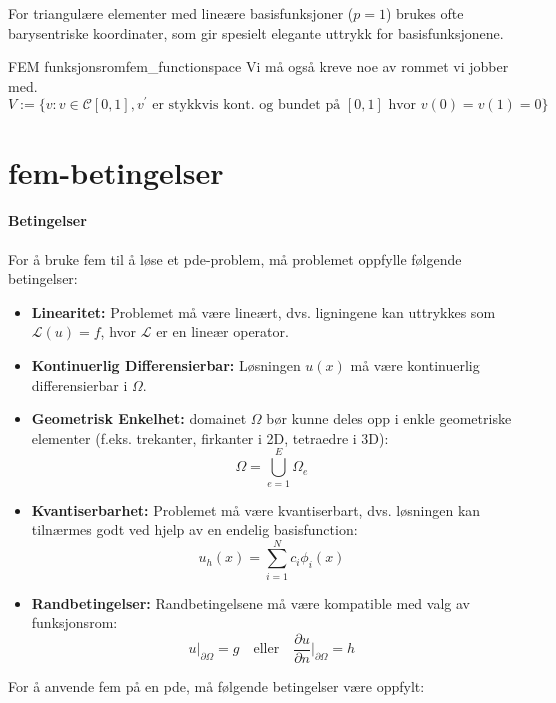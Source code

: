 For triangulære elementer med lineære basisfunksjoner ($p=1$) brukes ofte barysentriske koordinater, som gir spesielt elegante uttrykk for basisfunksjonene.

\begin{remark}{FEM funksjonsrom}{fem_functionspace}
    Vi må også kreve noe av rommet vi jobber med.
    \[
        V := \{v : v \in \mathcal{C}[0, 1], v^\prime \text{ er stykkvis kont. og bundet på } [0, 1] \text{ hvor } v(0)=v(1)= 0\}
    \]
\end{remark}

\section{fem-betingelser}

\paragraph{Betingelser}

For å bruke fem til å løse et pde-problem, må problemet oppfylle følgende betingelser:

\begin{itemize}
    \item \textbf{Linearitet:} Problemet må være lineært, dvs. ligningene kan uttrykkes som \(\mathcal{L}(u) = f\), hvor \(\mathcal{L}\) er en lineær operator.
    \item \textbf{Kontinuerlig Differensierbar:} Løsningen \( u(x) \) må være kontinuerlig differensierbar i \( \Omega \).
    \item \textbf{Geometrisk Enkelhet:} domainet \( \Omega \) bør kunne deles opp i enkle geometriske elementer (f.eks. trekanter, firkanter i 2D, tetraedre i 3D):
          \[
              \Omega = \bigcup_{e=1}^{E} \Omega_e
          \]
    \item \textbf{Kvantiserbarhet:} Problemet må være kvantiserbart, dvs. løsningen kan tilnærmes godt ved hjelp av en endelig basisfunction:
          \[
              u_h(x) = \sum_{i=1}^{N} c_i \phi_i(x)
          \]
    \item \textbf{Randbetingelser:} Randbetingelsene må være kompatible med valg av funksjonsrom:
          \[
              u|_{\partial \Omega} = g \quad \text{eller} \quad \frac{\partial u}{\partial n}\bigg|_{\partial \Omega} = h
          \]
\end{itemize}

For å anvende fem på en pde, må følgende betingelser være oppfylt:

